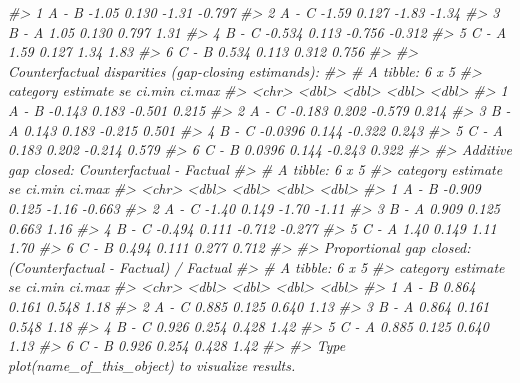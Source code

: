 \documentclass[
]{article}
\newenvironment{Shaded}{\begin{snugshade}}{\end{snugshade}}
\newcommand{\CommentTok}[1]{\textcolor[rgb]{0.56,0.35,0.01}{\textit{#1}}}
\begin{document}
\begin{Shaded}
\begin{Highlighting}[]
\CommentTok{\#\textgreater{} 1 A {-} B      {-}1.05  0.130 {-}1.31  {-}0.797}
\CommentTok{\#\textgreater{} 2 A {-} C      {-}1.59  0.127 {-}1.83  {-}1.34 }
\CommentTok{\#\textgreater{} 3 B {-} A       1.05  0.130  0.797  1.31 }
\CommentTok{\#\textgreater{} 4 B {-} C      {-}0.534 0.113 {-}0.756 {-}0.312}
\CommentTok{\#\textgreater{} 5 C {-} A       1.59  0.127  1.34   1.83 }
\CommentTok{\#\textgreater{} 6 C {-} B       0.534 0.113  0.312  0.756}
\CommentTok{\#\textgreater{} }
\CommentTok{\#\textgreater{} Counterfactual disparities (gap{-}closing estimands):}
\CommentTok{\#\textgreater{} \# A tibble: 6 x 5}
\CommentTok{\#\textgreater{}   category estimate    se ci.min ci.max}
\CommentTok{\#\textgreater{}   \textless{}chr\textgreater{}       \textless{}dbl\textgreater{} \textless{}dbl\textgreater{}  \textless{}dbl\textgreater{}  \textless{}dbl\textgreater{}}
\CommentTok{\#\textgreater{} 1 A {-} B     {-}0.143  0.183 {-}0.501  0.215}
\CommentTok{\#\textgreater{} 2 A {-} C     {-}0.183  0.202 {-}0.579  0.214}
\CommentTok{\#\textgreater{} 3 B {-} A      0.143  0.183 {-}0.215  0.501}
\CommentTok{\#\textgreater{} 4 B {-} C     {-}0.0396 0.144 {-}0.322  0.243}
\CommentTok{\#\textgreater{} 5 C {-} A      0.183  0.202 {-}0.214  0.579}
\CommentTok{\#\textgreater{} 6 C {-} B      0.0396 0.144 {-}0.243  0.322}
\CommentTok{\#\textgreater{} }
\CommentTok{\#\textgreater{} Additive gap closed: Counterfactual {-} Factual}
\CommentTok{\#\textgreater{} \# A tibble: 6 x 5}
\CommentTok{\#\textgreater{}   category estimate    se ci.min ci.max}
\CommentTok{\#\textgreater{}   \textless{}chr\textgreater{}       \textless{}dbl\textgreater{} \textless{}dbl\textgreater{}  \textless{}dbl\textgreater{}  \textless{}dbl\textgreater{}}
\CommentTok{\#\textgreater{} 1 A {-} B      {-}0.909 0.125 {-}1.16  {-}0.663}
\CommentTok{\#\textgreater{} 2 A {-} C      {-}1.40  0.149 {-}1.70  {-}1.11 }
\CommentTok{\#\textgreater{} 3 B {-} A       0.909 0.125  0.663  1.16 }
\CommentTok{\#\textgreater{} 4 B {-} C      {-}0.494 0.111 {-}0.712 {-}0.277}
\CommentTok{\#\textgreater{} 5 C {-} A       1.40  0.149  1.11   1.70 }
\CommentTok{\#\textgreater{} 6 C {-} B       0.494 0.111  0.277  0.712}
\CommentTok{\#\textgreater{} }
\CommentTok{\#\textgreater{} Proportional gap closed: (Counterfactual {-} Factual) / Factual}
\CommentTok{\#\textgreater{} \# A tibble: 6 x 5}
\CommentTok{\#\textgreater{}   category estimate    se ci.min ci.max}
\CommentTok{\#\textgreater{}   \textless{}chr\textgreater{}       \textless{}dbl\textgreater{} \textless{}dbl\textgreater{}  \textless{}dbl\textgreater{}  \textless{}dbl\textgreater{}}
\CommentTok{\#\textgreater{} 1 A {-} B       0.864 0.161  0.548   1.18}
\CommentTok{\#\textgreater{} 2 A {-} C       0.885 0.125  0.640   1.13}
\CommentTok{\#\textgreater{} 3 B {-} A       0.864 0.161  0.548   1.18}
\CommentTok{\#\textgreater{} 4 B {-} C       0.926 0.254  0.428   1.42}
\CommentTok{\#\textgreater{} 5 C {-} A       0.885 0.125  0.640   1.13}
\CommentTok{\#\textgreater{} 6 C {-} B       0.926 0.254  0.428   1.42}
\CommentTok{\#\textgreater{} }
\CommentTok{\#\textgreater{} Type plot(name\_of\_this\_object) to visualize results.}
\end{Highlighting}
\end{Shaded}
\end{document}
